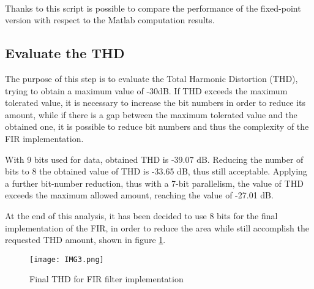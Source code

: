 \paragraph{}
Thanks to this script is possible to compare the performance of the fixed-point version with respect to 
the Matlab computation results.

\subsection{Evaluate the THD}

The purpose of this step is to evaluate the Total Harmonic Distortion (THD), trying to obtain a maximum 
value of -30dB. 
If THD exceeds the maximum tolerated value, it is necessary to increase 
the bit numbers in order to reduce its amount, while if there is a gap between the maximum tolerated value 
and the obtained one, it is possible to reduce bit numbers and thus the complexity of the FIR implementation.


With 9 bits used for data, obtained THD is -39.07 dB. 
Reducing the number of bits to 8 the obtained value of THD  
is -33.65 dB, thus still acceptable. 
Applying a further bit-number reduction, thus with a 7-bit parallelism, the value of THD exceeds the maximum allowed
amount, reaching the value of -27.01 dB.

At the end of this analysis, it has been decided to use 8 bits for the final implementation of the  FIR, 
in order to reduce the area while still accomplish the requested THD amount, shown in figure \ref{fig:3}.
\begin{figure}[!h]
	\caption{Final THD for FIR filter implementation}
	\label{fig:3}
	\texttt{[image: IMG3.png]}
	\centering
\end{figure}

